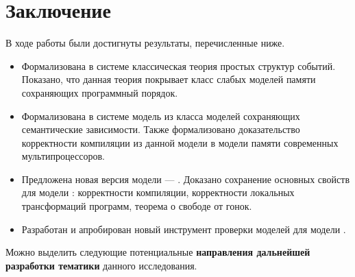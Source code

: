 \chapter*{Заключение}                       %


В ходе работы были достигнуты результаты, перечисленные ниже.

\begin{itemize}

  \item Формализована в системе \coq классическая теория
    простых структур событий. Показано, что данная теория
    покрывает класс слабых моделей памяти сохраняющих программный порядок. 

  \item Формализована в системе \coq модель \Wkm из
    класса моделей сохраняющих семантические зависимости.
    Также формализовано доказательство корректности компиляции
    из данной модели в модели памяти современных мультипроцессоров.

  \item Предложена новая версия модели \Wkm --- \WkmS.
    Доказано сохранение основных свойств \Wkm для модели \WkmS:
    корректности компиляции, корректности локальных трансформаций программ, 
    теорема о свободе от гонок.

  \item Разработан и апробирован новый инструмент проверки моделей \wmc для модели \WkmS.

\end{itemize}

Можно выделить следующие потенциальные
\textbf{направления дальнейшей разработки тематики}
данного исследования.


